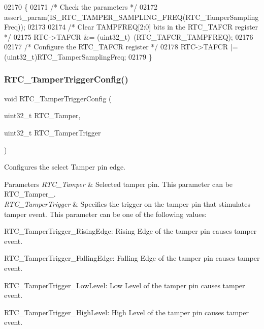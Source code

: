 \begin{DoxyCode}
02170 \{
02171   \textcolor{comment}{/* Check the parameters */}
02172   assert_param(IS_RTC_TAMPER_SAMPLING_FREQ(RTC\_TamperSamplingFreq));
02173  
02174   \textcolor{comment}{/* Clear TAMPFREQ[2:0] bits in the RTC\_TAFCR register */}
02175   RTC->TAFCR &= (uint32\_t)~(RTC_TAFCR_TAMPFREQ);
02176 
02177   \textcolor{comment}{/* Configure the RTC\_TAFCR register */}
02178   RTC->TAFCR |= (uint32\_t)RTC\_TamperSamplingFreq;
02179 \}
\end{DoxyCode}
\mbox{\label{group__RTC__Group9_gad547d636cfc4fd8d4d673325571e0ffb}} 
\subsubsection{R\+T\+C\+\_\+\+Tamper\+Trigger\+Config()}
{\footnotesize\ttfamily void R\+T\+C\+\_\+\+Tamper\+Trigger\+Config (\begin{DoxyParamCaption}\item[{uint32\+\_\+t}]{R\+T\+C\+\_\+\+Tamper,  }\item[{uint32\+\_\+t}]{R\+T\+C\+\_\+\+Tamper\+Trigger }\end{DoxyParamCaption})}



Configures the select Tamper pin edge. 


\begin{DoxyParams}{Parameters}
{\em R\+T\+C\+\_\+\+Tamper} & Selected tamper pin. This parameter can be R\+T\+C\+\_\+\+Tamper\+\_. \\
\hline
{\em R\+T\+C\+\_\+\+Tamper\+Trigger} & Specifies the trigger on the tamper pin that stimulates tamper event. This parameter can be one of the following values\+: \begin{DoxyItemize}
\item R\+T\+C\+\_\+\+Tamper\+Trigger\+\_\+\+Rising\+Edge\+: Rising Edge of the tamper pin causes tamper event. \item R\+T\+C\+\_\+\+Tamper\+Trigger\+\_\+\+Falling\+Edge\+: Falling Edge of the tamper pin causes tamper event. \item R\+T\+C\+\_\+\+Tamper\+Trigger\+\_\+\+Low\+Level\+: Low Level of the tamper pin causes tamper event. \item R\+T\+C\+\_\+\+Tamper\+Trigger\+\_\+\+High\+Level\+: High Level of the tamper pin causes tamper event. \end{DoxyItemize}
\\
\hline
\end{DoxyParams}

